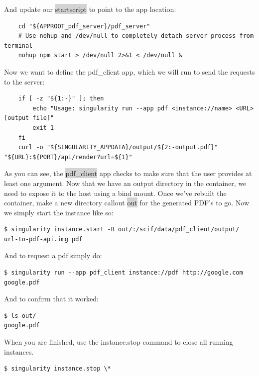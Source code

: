 \documentclass[a4paper]{article}
\begin{document}
    And update our \colorbox{lightgray}{startscript} to point to the app location:
    
\begin{lstlisting}[frame=single] 
%startscript
    cd "${APPROOT_pdf_server}/pdf_server"
    # Use nohup and /dev/null to completely detach server process from terminal
    nohup npm start > /dev/null 2>&1 < /dev/null & 
\end{lstlisting}
    Now we want to define the pdf\_client app, which we will run to send the requests to the server:
    
\begin{lstlisting}[frame=single]  
%apprun pdf_client
    if [ -z "${1:-}" ]; then
        echo "Usage: singularity run --app pdf <instance://name> <URL> [output file]"
        exit 1
    fi
    curl -o "${SINGULARITY_APPDATA}/output/${2:-output.pdf}" "${URL}:${PORT}/api/render?url=${1}"
\end{lstlisting}
    
    As you can see, the \colorbox{lightgray}{pdf\_client} app checks to make sure that the user provides at least one argument. Now that we have an output directory in the container, we need to expose it to the host using a bind mount. Once we’ve rebuilt the container, make a new directory callout \colorbox{lightgray}{out} for the generated PDF’s to go. Now we simply start the instance like so:
    
\begin{lstlisting}[frame=single] 
$ singularity instance.start -B out/:/scif/data/pdf_client/output/ url-to-pdf-api.img pdf 
\end{lstlisting}
And to request a pdf simply do:

\begin{lstlisting}[frame=single]
$ singularity run --app pdf_client instance://pdf http://google.com google.pdf  
\end{lstlisting}

And to confirm that it worked:

\begin{lstlisting}[frame=single]  
$ ls out/
google.pdf
\end{lstlisting}

When you are finished, use the instance.stop command to close all running instances.

\begin{lstlisting}[frame=single] 
$ singularity instance.stop \* 
\end{lstlisting}
    
\end{document}
